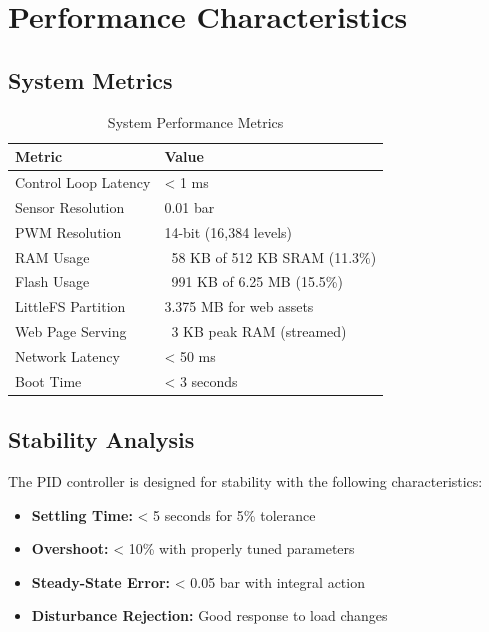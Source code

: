 
\section{Performance Characteristics}

\subsection{System Metrics}
\begin{table}[H]
\centering
\begin{tabular}{@{}ll@{}}
\toprule
\textbf{Metric} & \textbf{Value} \\
\midrule
Control Loop Latency & < 1 ms \\
Sensor Resolution & 0.01 bar \\
PWM Resolution & 14-bit (16,384 levels) \\
RAM Usage & ~58 KB of 512 KB SRAM (11.3\%) \\
Flash Usage & ~991 KB of 6.25 MB (15.5\%) \\
LittleFS Partition & 3.375 MB for web assets \\
Web Page Serving & ~3 KB peak RAM (streamed) \\
Network Latency & < 50 ms \\
Boot Time & < 3 seconds \\
\bottomrule
\end{tabular}
\caption{System Performance Metrics}
\end{table}

\subsection{Stability Analysis}
The PID controller is designed for stability with the following characteristics:
\begin{itemize}
    \item \textbf{Settling Time:} < 5 seconds for 5\% tolerance
    \item \textbf{Overshoot:} < 10\% with properly tuned parameters
    \item \textbf{Steady-State Error:} < 0.05 bar with integral action
    \item \textbf{Disturbance Rejection:} Good response to load changes
\end{itemize}
